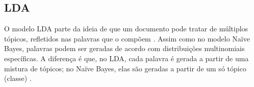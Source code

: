 










\subsection{LDA}
\label{subsection:LDA}


O modelo LDA parte da ideia de que um documento pode tratar de múltiplos tópicos, refletidos nas palavras que o compõem \cite{pnas}. Assim como no modelo Naïve Bayes, palavras podem ser geradas de acordo com distribuições multinomiais específicas. A diferença é que, no LDA, cada palavra é gerada a partir de uma mistura de tópicos; no Naïve Bayes, elas são geradas a partir de um só tópico (classe) \cite{gibbs-lingpipe}.

